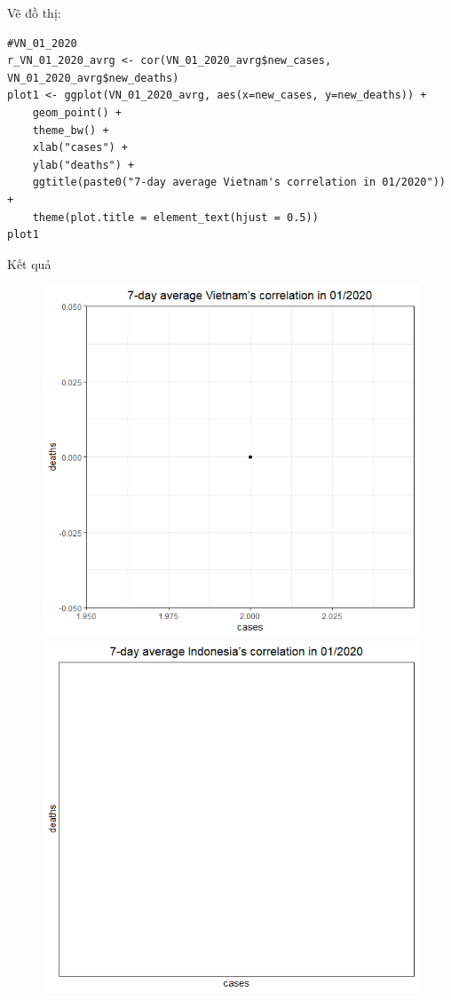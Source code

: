 \documentclass[a4paper]{article}
\theoremstyle{definition}
\begin{document}
\begin{enumerate}[1)]
Vẽ đồ thị: 

\begin{lstlisting}
#VN_01_2020
r_VN_01_2020_avrg <- cor(VN_01_2020_avrg$new_cases, VN_01_2020_avrg$new_deaths)
plot1 <- ggplot(VN_01_2020_avrg, aes(x=new_cases, y=new_deaths)) + 
    geom_point() + 
    theme_bw() + 
    xlab("cases") + 
    ylab("deaths") + 
    ggtitle(paste0("7-day average Vietnam's correlation in 01/2020")) +
    theme(plot.title = element_text(hjust = 0.5))
plot1
\end{lstlisting}

Kết quả

    \begin{figure}[H]
    \begin{center}
        \includegraphics[scale = 0.3]{ix/ix.3/VN_01_2020.png}
        \includegraphics[scale = 0.3]{ix/ix.3/IDN_01_2020.png}

\end{center}
\end{figure}
\end{enumerate}
\end{document}
